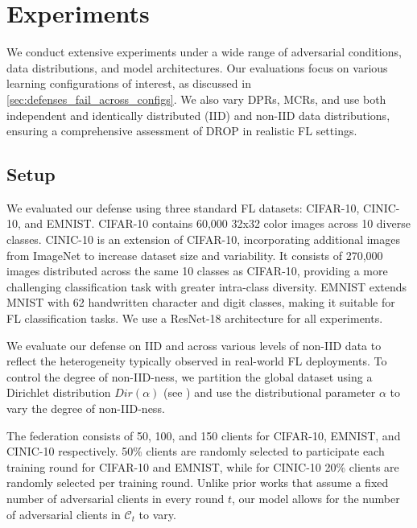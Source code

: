 \section{Experiments}
\label{sec:experiments}

We conduct extensive experiments under a wide range of adversarial conditions, data distributions, and model architectures. Our evaluations focus on various learning configurations of interest, as discussed in  \cref{sec:defenses_fail_across_configs}. We also vary DPRs, MCRs, and use both independent and identically distributed (IID) and non-IID data distributions, ensuring a comprehensive assessment of DROP in realistic FL settings.

\subsection{Setup}

We evaluated our defense using three standard FL datasets: CIFAR-10, CINIC-10, and EMNIST.
CIFAR-10 \citep{krizhevsky2009learning} contains 60,000 32x32 color images across 10 diverse classes.
CINIC-10 \citep{darlow2018cinic} is an extension of CIFAR-10, incorporating additional images from ImageNet \citep{imagenet} to increase dataset size and variability. It consists of 270,000 images distributed across the same 10 classes as CIFAR-10, providing a more challenging classification task with greater intra-class diversity.  
EMNIST \citep{cohen2017emnistextensionmnisthandwritten} extends MNIST \citep{mnist} with 62 handwritten character and digit classes, making it suitable for FL classification tasks. We use a ResNet-18 architecture \citep{he2015deepresiduallearningimage} for all experiments.

We evaluate our defense on IID and across various levels of non-IID data to reflect the heterogeneity typically observed in real-world FL deployments. To control the degree of non-IID-ness, we partition the global dataset using a Dirichlet distribution $Dir(\alpha)$ \citep{li2021federatedlearningnoniiddata} (see ) and use the distributional parameter $\alpha$ to vary the degree of non-IID-ness.

 The federation consists of 50, 100, and 150 clients for CIFAR-10, EMNIST, and CINIC-10 respectively. 50\% clients are randomly selected to participate each training round for CIFAR-10 and EMNIST, while for CINIC-10 20\% clients are randomly selected per training round.
Unlike prior works \citep{blanchard2017machine,zhang2023flip} that assume a fixed number of adversarial clients in every round $t$, our model allows for the number of adversarial clients in \(\mathcal{C}_t\) to vary.


